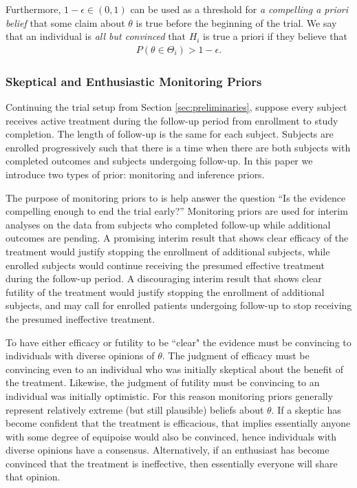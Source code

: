 \documentclass[12pt]{article}
\begin{document}
Furthermore, $1-\epsilon\in(0,1)$ can be used as a threshold for \textit{a compelling a priori belief} that some claim about $\theta$ is true before the beginning of the trial. We say that an individual is \textit{all but convinced} that $H_i$ is true a priori if they believe that
\begin{align}\label{eq:compellingapriori}
P(\theta\in\Theta_i)>1-\epsilon.
\end{align} 

\subsubsection{Skeptical and Enthusiastic Monitoring Priors}\label{sec:MP}
Continuing the trial setup from Section \ref{sec:preliminaries}, suppose every subject receives active treatment during the follow-up period from enrollment to study completion. The length of follow-up is the same for each subject. Subjects are enrolled progressively such that there is a time when there are both subjects with completed outcomes and subjects undergoing follow-up. In this paper we introduce two types of prior: monitoring and inference priors. 

The purpose of monitoring priors to is help answer the question ``Is the evidence compelling enough to end the trial early?'' Monitoring priors are used for interim analyses on the data from subjects who completed follow-up while additional outcomes are pending. A promising interim result that shows clear efficacy of the treatment would justify stopping the enrollment of additional subjects, while enrolled subjects would continue receiving the presumed effective treatment during the follow-up period. A discouraging interim result that shows clear futility of the treatment would justify stopping the enrollment of additional subjects, and may call for enrolled patients undergoing follow-up to stop receiving the presumed ineffective treatment. 

To have either efficacy or futility to be ``clear" the evidence must be convincing to individuals with diverse opinions of $\theta$. The judgment of efficacy must be convincing even to an individual who was initially skeptical about the benefit of the treatment. Likewise, the judgment of futility must be convincing to an individual was initially optimistic. For this reason monitoring priors generally represent relatively extreme (but still plausible) beliefs about $\theta$. If a skeptic has become confident that the treatment is efficacious, 
that implies essentially anyone with some degree of equipoise would also be convinced, hence individuals with diverse opinions have a consensus. Alternatively, if an enthusiast has become convinced that the treatment is ineffective, then essentially everyone will share that opinion. 
\end{document}
